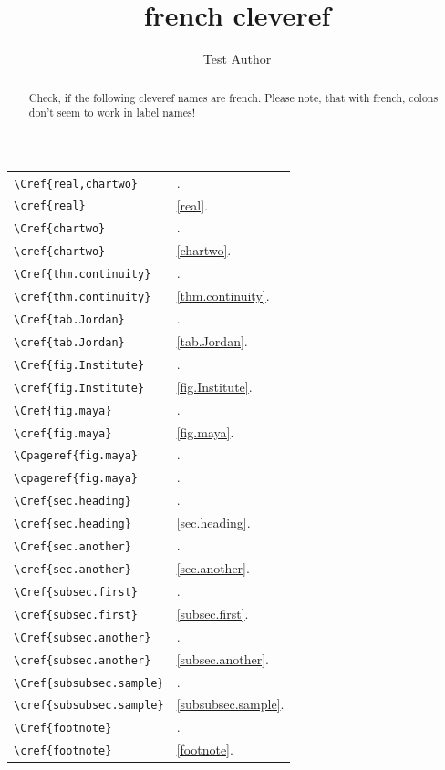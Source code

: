 \documentclass{snapshotmfo}
\author{Test Author}
\title{french cleveref}
\begin{document}

\begin{abstract}
Check, if the following cleveref names are french. Please note, that with french, colons don't seem to work in label names!
\end{abstract}

\noindent\begin{longtable}{@{}l@{\quad yields\quad}l@{}}
	\verb+\Cref{real,chartwo}+     &\Cref{real,chartwo}.\\
	\verb+\cref{real}+             &\cref{real}.\\[1ex]
	\verb+\Cref{chartwo}+          &\Cref{chartwo}.\\
	\verb+\cref{chartwo}+          &\cref{chartwo}.\\[1ex]
	\verb+\Cref{thm.continuity}+   &\Cref{thm.continuity}.\\
	\verb+\cref{thm.continuity}+   &\cref{thm.continuity}.\\[1ex]
	\verb+\Cref{tab.Jordan}+       &\Cref{tab.Jordan}.\\
	\verb+\cref{tab.Jordan}+       &\cref{tab.Jordan}.\\[1ex]
	\verb+\Cref{fig.Institute}+    &\Cref{fig.Institute}.\\
	\verb+\cref{fig.Institute}+    &\cref{fig.Institute}.\\[1ex]
	\verb+\Cref{fig.maya}+         &\Cref{fig.maya}.\\
	\verb+\cref{fig.maya}+         &\cref{fig.maya}.\\[1ex]
	\verb+\Cpageref{fig.maya}+     &\Cpageref{fig.maya}.\\
	\verb+\cpageref{fig.maya}+     &\cpageref{fig.maya}.\\[1ex]
	\verb+\Cref{sec.heading}+      &\Cref{sec.heading}.\\
	\verb+\cref{sec.heading}+      &\cref{sec.heading}.\\[1ex]
	\verb+\Cref{sec.another}+      &\Cref{sec.another}.\\
	\verb+\cref{sec.another}+      &\cref{sec.another}.\\[1ex]
	\verb+\Cref{subsec.first}+     &\Cref{subsec.first}.\\
	\verb+\cref{subsec.first}+     &\cref{subsec.first}.\\[1ex]
	\pagebreak
	\verb+\Cref{subsec.another}+   &\Cref{subsec.another}.\\
	\verb+\cref{subsec.another}+   &\cref{subsec.another}.\\[1ex]
	\verb+\Cref{subsubsec.sample}+ &\Cref{subsubsec.sample}.\\
	\verb+\cref{subsubsec.sample}+ &\cref{subsubsec.sample}.\\[1ex]
	\verb+\Cref{footnote}+         &\Cref{footnote}.\\
	\verb+\cref{footnote}+         &\cref{footnote}.\\
\end{longtable}
\end{document}
